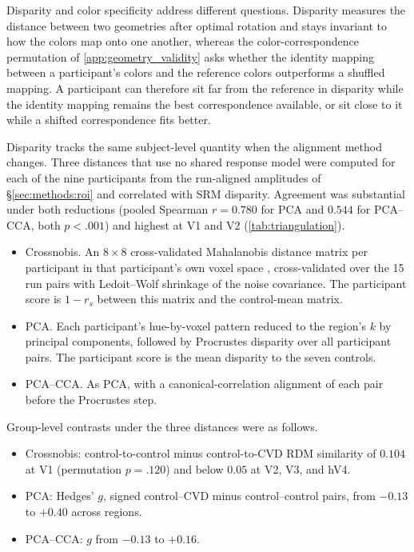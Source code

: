 Disparity and color specificity address different questions. Disparity measures the distance between two geometries after optimal rotation and stays invariant to how the colors map onto one another, whereas the color-correspondence permutation of \cref{app:geometry_validity} asks whether the identity mapping between a participant's colors and the reference colors outperforms a shuffled mapping. A participant can therefore sit far from the reference in disparity while the identity mapping remains the best correspondence available, or sit close to it while a shifted correspondence fits better.



Disparity tracks the same subject-level quantity when the alignment method changes. Three distances that use no shared response model were computed for each of the nine participants from the run-aligned amplitudes of \S\ref{sec:methods:roi} and correlated with SRM disparity. Agreement was substantial under both reductions (pooled Spearman $r = 0.780$ for PCA and $0.544$ for PCA--CCA, both $p < .001$) and highest at V1 and V2 (\cref{tab:triangulation}).
\begin{itemize}
\item Crossnobis. An $8 \times 8$ cross-validated Mahalanobis distance matrix per participant in that participant's own voxel space \parencite{walther2016}, cross-validated over the 15 run pairs with Ledoit--Wolf shrinkage of the noise covariance. The participant score is $1 - r_s$ between this matrix and the control-mean matrix.
\item PCA. Each participant's hue-by-voxel pattern reduced to the region's $k$ by principal components, followed by Procrustes disparity over all participant pairs. The participant score is the mean disparity to the seven controls.
\item PCA--CCA. As PCA, with a canonical-correlation alignment of each pair before the Procrustes step.
\end{itemize}
Group-level contrasts under the three distances were as follows.
\begin{itemize}
\item Crossnobis: control-to-control minus control-to-CVD RDM similarity of $0.104$ at V1 (permutation $p = .120$) and below $0.05$ at V2, V3, and hV4.
\item PCA: Hedges' $g$, signed control--CVD minus control--control pairs, from $-0.13$ to $+0.40$ across regions.
\item PCA--CCA: $g$ from $-0.13$ to $+0.16$.
\end{itemize}
